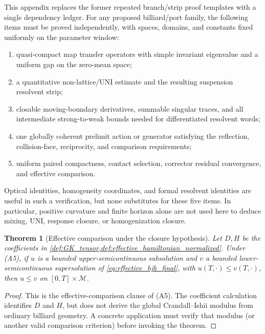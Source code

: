 \documentclass[12pt, letterpaper]{amsart}
\newcommand{\Mcal}{\mathcal{M}}
\theoremstyle{plain}
\newtheorem{theorem}{Theorem}[section]
\theoremstyle{definition}
\theoremstyle{remark}
\begin{document}
This appendix replaces the former repeated branch/strip proof templates with a
single dependency ledger.  For any proposed billiard/port family, the following
items must be proved independently, with spaces, domains, and constants fixed
uniformly on the parameter window:
\begin{enumerate}[label=\textup{(A\arabic*)}, wide, labelindent=0pt]
    \item quasi-compact map transfer operators with simple invariant
    eigenvalue and a uniform gap on the zero-mean space;
    \item a quantitative non-lattice/UNI estimate and the resulting suspension
    resolvent strip;
    \item closable moving-boundary derivatives, summable singular traces, and
    all intermediate strong-to-weak bounds needed for differentiated resolvent
    words;
    \item one globally coherent prelimit action or generator satisfying the
    reflection, collision-face, reciprocity, and comparison requirements;
    \item uniform paired compactness, contact selection, corrector residual
    convergence, and effective comparison.
\end{enumerate}
Optical identities, homogeneity coordinates, and formal resolvent identities
are useful in such a verification, but none substitutes for these five items.
In particular, positive curvature and finite horizon alone are not used here to
deduce mixing, UNI, response closure, or homogenization closure.

\begin{theorem}[Effective comparison under the closure hypothesis]
Let $D,H$ be the coefficients in
\cref{def:GK_tensor,def:effective_hamiltonian_normalized}.  Under
\textup{(A5)}, if $u$ is a bounded upper-semicontinuous subsolution and $v$ a
bounded lower-semicontinuous supersolution of
\eqref{eq:effective_hjb_final}, with $u(T,\cdot)\le v(T,\cdot)$, then
$u\le v$ on $[0,T]\times\Mcal$.
\end{theorem}

\begin{proof}
This is the effective-comparison clause of \textup{(A5)}.  The coefficient
calculation identifies $D$ and $H$, but does not derive the global
Crandall--Ishii modulus from ordinary billiard geometry.  A concrete application
must verify that modulus (or another valid comparison criterion) before invoking
the theorem.
\end{proof}
\end{document}
